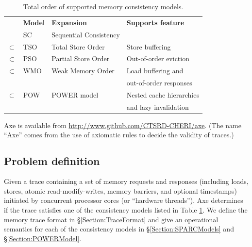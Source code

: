 \documentclass[11pt]{article}
\begin{document}
\begin{table}
\renewcommand{\arraystretch}{1.5}
\begin{center}
\begin{tabular}{llll}
          & \textbf{Model}  & \textbf{Expansion} & \textbf{Supports feature} \\
          & SC     & Sequential Consistency \cite{SC} \\
$\subset$ & TSO    & Total Store Order \cite{SPARC} & Store buffering \\
$\subset$ & PSO    & Partial Store Order \cite{SPARC} & Out-of-order eviction \\
$\subset$ & WMO\footnotemark[2]
                   & Weak Memory Order \cite{SPARC} & Load buffering and \\
          &        & & out-of-order responses \\
$\subset$ & POW    & POWER model \cite{POWER} & Nested
                       cache hierarchies\\
          &        & & and lazy invalidation
\end{tabular}
\end{center}
\caption{Total order of supported memory consistency models.}
\label{Table:Models}
\end{table}


Axe is available from \url{http://www.github.com/CTSRD-CHERI/axe}.
(The name ``Axe'' comes from the use of axiomatic rules to decide the
validity of traces.)

\subsection{Problem definition}
\label{Section:ProbDef}

Given a trace containing a set of memory requests and responses
(including loads, stores, atomic read-modify-writes, memory barriers,
and optional timestamps) initiated by concurrent processor cores (or
``hardware threads''), Axe determines if the trace satisfies one of
the consistency models listed in Table \ref{Table:Models}.  We define
the memory trace format in \S\ref{Section:TraceFormat} and give an
operational semantics for each of the consistency models in
\S\ref{Section:SPARCModels} and \S\ref{Section:POWERModel}.
\end{document}
